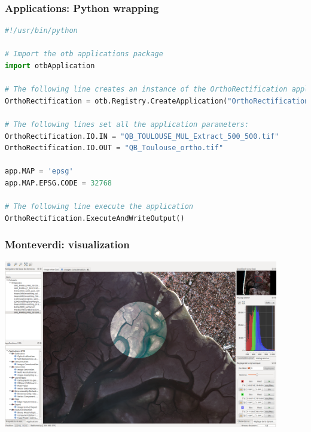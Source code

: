 \documentclass[8pt]{beamer}
\begin{document}
\begin{frame}[fragile]
\frametitle{Applications: Python wrapping}
\begin{lstlisting}[language=python,breaklines=true,breakatwhitespace=true,frame
    = tb,framerule =
    0.25pt,fontadjust,backgroundcolor={\color{listlightgray}},basicstyle =
    {\ttfamily\tiny},keywordstyle =
    {\ttfamily\color{listkeyword}\textbf},identifierstyle =
    {\ttfamily},commentstyle = {\ttfamily\color{listcomment}\textit},stringstyle
    = {\ttfamily},showstringspaces = false,showtabs = false,numbers =
    none,numbersep = 6pt, numberstyle={\ttfamily\color{listnumbers}},tabsize =
    2]
#!/usr/bin/python 
 
# Import the otb applications package 
import otbApplication 
 
# The following line creates an instance of the OrthoRectification application 
OrthoRectification = otb.Registry.CreateApplication("OrthoRectification") 
 
# The following lines set all the application parameters: 
OrthoRectification.IO.IN = "QB_TOULOUSE_MUL_Extract_500_500.tif"
OrthoRectification.IO.OUT = "QB_Toulouse_ortho.tif"
 
app.MAP = 'epsg'
app.MAP.EPSG.CODE = 32768

# The following line execute the application 
OrthoRectification.ExecuteAndWriteOutput()
\end{lstlisting}
\end{frame}


\begin{frame}
\frametitle{Monteverdi: visualization}
\begin{minipage}[t][6cm][t]{\textwidth}
\begin{center}
\includegraphics[width=0.9\textwidth]{images/monteverdi2-loupe.png}
\end{center}
\end{minipage}
\end{frame}
\end{document}
